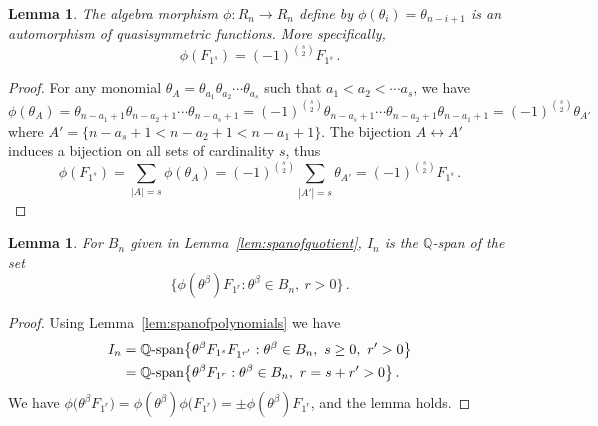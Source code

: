 \documentclass[11pt]{amsart}
\newtheorem{lemma}[theorem]{Lemma}
\theoremstyle{definition}
\numberwithin{equation}{section}
\begin{document}
\begin{lemma}\label{lem:automorphism}
The algebra morphism $\phi\colon R_n\to R_n$ define by $\phi(\theta_i)=\theta_{n-i+1}$
is an automorphism of quasisymmetric functions. More specifically,
\begin{equation}\label{eq:autoquasi}
\phi(F_{1^s})=(-1)^{s \choose 2} F_{1^s}\,.
\end{equation}
\end{lemma}

\begin{proof} 
For any monomial $\theta_A = \theta_{a_1}\theta_{a_2}\cdots \theta_{a_s}$ such that $a_1<a_2<\cdots a_s$, we have
$$\phi(\theta_A) =  \theta_{n-a_1+1}\theta_{n-a_2+1}\cdots \theta_{n-a_s+1}
= (-1)^{s \choose 2}  \theta_{n-a_s+1}\cdots\theta_{n-a_{2}+1} \theta_{n-a_1+1}
= (-1)^{s \choose 2} \theta_{A'}$$
where $A'=\big\{ n-a_s+1< n-a_{2}+1<n-a_1+1\big\}$.
The bijection $A\leftrightarrow A'$ induces a bijection on all sets of cardinality $s$, thus
$$\phi(F_{1^s})= \sum_{|A|=s} \phi(\theta_A) =  (-1)^{s \choose 2} \sum_{|A'|=s} \theta_{A'}=(-1)^{s \choose 2} F_{1^s}\,.$$
\end{proof}

\begin{lemma}\label{lem:idealpres}
For $B_n$ given in Lemma~\ref{lem:spanofquotient}, $I_n$ is the ${\mathbb Q}$-span of the set
\begin{equation}\label{eq:autoquasi}
\big\{ \phi(\theta^\beta) F_{1^r} : \theta^\beta \in B_n,\ r>0\big\}\,.
\end{equation}
\end{lemma}

\begin{proof} Using Lemma~\ref{lem:spanofpolynomials} we have
\begin{align*}
 I_n &=  {\mathbb Q}\text{\rm -span}\big\{  \theta^\beta F_{1^s} F_{1^{r'}} :  \theta^\beta \in B_n,\  s\ge 0,\  r'>0\big\}\\
       &=  {\mathbb Q}\text{\rm -span}\big\{  \theta^\beta F_{1^{r}} :  \theta^\beta \in B_n,\  r=s+r'>0\big\}\,.
 \end{align*}
We have $\phi\big(\theta^\beta F_{1^r}\big)=\phi(\theta^\beta) \phi\big(F_{1^r}\big) = \pm \phi(\theta^\beta) F_{1^r}$, and the lemma holds.
\end{proof}



\end{document}
